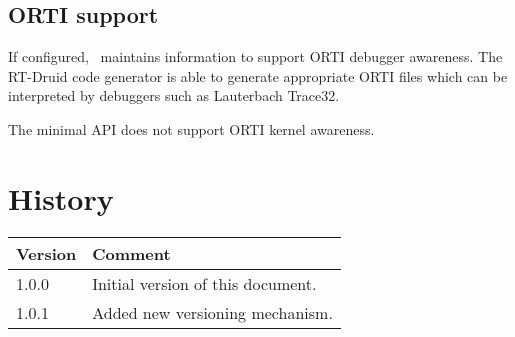 \documentclass[12pt,a4paper,normalheadings,titlepage]{scrreprt}
\begin{document}

\section{ORTI support}

If configured, \ee\ maintains information to support ORTI debugger
awareness. The RT-Druid code generator is able to generate appropriate
ORTI files which can be interpreted by debuggers such as Lauterbach
Trace32.

The minimal API does not support ORTI kernel awareness.

\chapter{History}

\begin{tabular}{|p{}|p{}|}
\hline 
Version&
Comment\tabularnewline
\hline
\hline 
1.0.0&
Initial version of this document.\tabularnewline
\hline 
1.0.1&
Added new versioning mechanism.\tabularnewline
\hline 
\end{tabular}


%
%

\printindex
\end{document}
